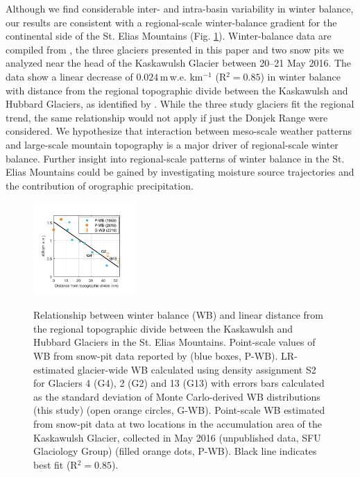 \documentclass[review,oneside, letterpaper]{igs}
\begin{document}
Although we find considerable inter- and intra-basin variability in winter balance, our results are consistent with a regional-scale winter-balance gradient for the continental side of the St. Elias Mountains (Fig. \ref{fig:AccumGrad}). Winter-balance data are compiled from \cite{Taylor1969}, the three glaciers presented in this paper and two snow pits we analyzed near the head of the Kaskawulsh Glacier between 20--21 May 2016. The data show a linear decrease of $0.024$\,m\,w.e. km$^{-1}$ (R$^2=0.85$) in winter balance with distance from the regional topographic divide between the Kaskawulsh and Hubbard Glaciers, as identified by \cite{Taylor1969}. While the three study glaciers fit the regional trend, the same relationship would not apply if just the Donjek Range were considered. We hypothesize that interaction between meso-scale weather patterns and large-scale mountain topography is a major driver of regional-scale winter balance. Further insight into regional-scale patterns of winter balance in the St. Elias Mountains could be gained by investigating moisture source trajectories and the contribution of orographic precipitation. 

\begin{figure}
	\centering
	\includegraphics[width =0.35\textwidth]{AccumGrad.pdf}\\
	\caption{Relationship between winter balance (WB) and linear distance from the regional topographic divide between the Kaskawulsh and Hubbard Glaciers in the St. Elias Mountains. Point-scale values of WB from snow-pit data reported by \cite{Taylor1969} (blue boxes, P-WB). LR-estimated glacier-wide WB calculated using density assignment S2 for Glaciers 4 (G4), 2 (G2) and 13 (G13) with errors bars calculated as the standard deviation of Monte Carlo-derived WB distributions (this study) (open orange circles, G-WB). Point-scale WB estimated from snow-pit data at two locations in the accumulation area of the Kaskawulsh Glacier, collected in May 2016 (unpublished data, SFU Glaciology Group) (filled orange dots, P-WB). Black line indicates best fit (R$^2=0.85$).}
	\label{fig:AccumGrad}
\end{figure}
\end{document}

